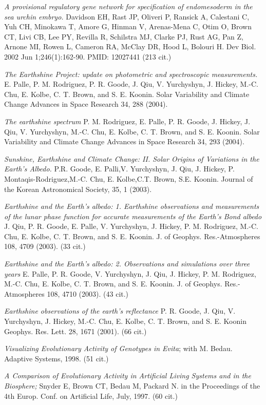\documentclass[margin,line]{resume}
\begin{document}
\begin{resume}
{\em A provisional regulatory gene network for specification of endomesoderm in the sea urchin embryo.}
Davidson EH, Rast JP, Oliveri P, Ransick A, Calestani C, Yuh CH, Minokawa T, Amore G, Hinman V, Arenas-Mena C, Otim O, Brown CT, Livi CB, Lee PY, Revilla R, Schilstra MJ, Clarke PJ, Rust AG, Pan Z, Arnone MI, Rowen L, Cameron RA, McClay DR, Hood L, Bolouri H.
Dev Biol. 2002 Jun 1;246(1):162-90.
PMID: 12027441 (213 cit.)

{\em The Earthshine Project: update on photometric and spectroscopic measurements.}
 E. Palle, P. M. Rodriguez, P. R. Goode, J. Qiu, V. Yurchyshyn, J. Hickey, M.-C. Chu, E. Kolbe, C. T. Brown, and S. E. Koonin.
Solar Variability and Climate Change Advances in Space Research 34, 288 (2004).

{\em The earthshine spectrum}
P. M. Rodriguez, E. Palle, P. R. Goode, J. Hickey, J. Qiu, V. Yurchyshyn, M.-C. Chu, E. Kolbe, C. T. Brown, and S. E. Koonin.
Solar Variability and Climate Change Advances in Space Research 34, 293 (2004).

{\em Sunshine, Earthshine and Climate Change: II. Solar Origins of Variations in the Earth's Albedo.}  P.R. Goode, E. Palli,V. Yurchyshyn, J. Qiu,
 J. Hickey, P. Montaqis-Rodriguez,M.-C. Chu,
 E. Kolbe,C.T. Brown, S.E. Koonin.
Journal of the Korean Astronomical Society, 35, 1 (2003).

{\em Earthshine and the Earth's albedo: 1. Earthshine observations and measurements of the lunar phase function for accurate measurements of the Earth's Bond albedo}
J. Qiu, P. R. Goode, E. Palle, V. Yurchyshyn, J. Hickey, P. M. Rodriguez, M.-C. Chu, E. Kolbe, C. T. Brown, and S. E. Koonin.
J. of Geophys. Res.-Atmospheres 108, 4709 (2003).  (33 cit.)

{\em Earthshine and the Earth's albedo: 2. Observations and simulations over three years}
 E. Palle, P. R. Goode, V. Yurchyshyn, J. Qiu, J. Hickey, P. M. Rodriguez, M.-C. Chu, E. Kolbe, C. T. Brown, and S. E. Koonin.
J. of Geophys. Res.-Atmospheres 108, 4710 (2003). (43 cit.)

{\em Earthshine observations of the earth's reflectance}
P. R. Goode, J. Qiu, V. Yurchyshyn, J. Hickey, M.-C. Chu, E. Kolbe, C. T. Brown, and S. E. Koonin
Geophys. Res. Lett. 28, 1671 (2001). (66 cit.)

{\em Visualizing Evolutionary Activity of Genotypes in Evita};
with M. Bedau.  Adaptive Systems, 1998. (51 cit.)

{\em A Comparison of Evolutionary Activity in Artificial Living Systems and in the 
	Biosphere;} Snyder E, Brown CT, Bedau M, Packard N.
in the Proceedings of the 4th Europ. Conf. on 
Artificial Life, July, 1997.  (60 cit.)


\end{resume}
\end{document}
